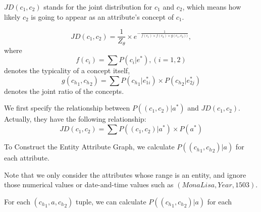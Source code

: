 $JD(c_1,c_2)$ stands for the joint distribution for $c_1$ and $c_2$, which means how likely $c_2$ is going to appear as an attribute's concept of $c_1$.

\begin{definition}[Definition of $JD(c_1,c_2)$]

  $$ JD(c_1,c_2) = \frac{1}{Z_\theta}\times e^{- \frac{1}{f(c_1)\times f(c_2)\times g(c_1,c_2))}},$$   
  where $$f(c_i)=\sum{ P(c_i|e^*) },(i=1,2)$$ 
  denotes the typicality of a concept itself, $$g({c_h}_1 ,{c_h}_2 )=\sum P({c_h}_{1}|e_{1i}^*) \times P({c_h}_{2}|e_{2j}^*)$$
  denotes the joint ratio of the concepts.


\end{definition}





We first specify the relationship between $P((c_{1},c_{2})|a^*) $ and $JD(c_1,c_2)$. Actually, they have the following relationship:
\begin{equation}\label{eq:rel_jdp}
  JD(c_1,c_2) = \sum{ P((c_{1},c_{2})|a^*) \times P(a^*)}
\end{equation}
\xch{===========================} 



To Construct the Entity Attribute Graph, we calculate $P(({c_h}_{1},{c_h}_{2}) |a)$ for each attribute.




Note that we only consider the attributes whose range is an entity, and ignore those numerical values or date-and-time values such as $( Mona Lisa, Year, 1503)$.





For each $({c_h}_{1},a,{c_h}_{2})$ tuple, we can calculate $P(({c_h}_{1},{c_h}_{2}) |a)$ for each









